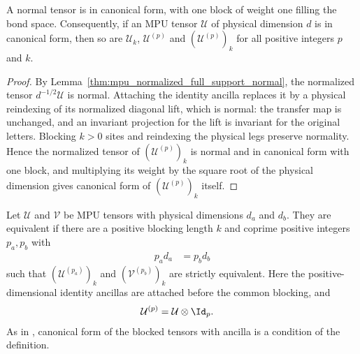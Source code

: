 \begin{lemma}
    \label{thm:mpu_canonical_form_ancilla_blocking}
    \leanok
    A normal tensor is in canonical form, with one block of weight one
    filling the bond space. Consequently, if an MPU tensor $\mathcal U$ of
    physical dimension $d$ is in canonical form, then so are $\mathcal U_k$,
    $\mathcal U^{(p)}$ and $(\mathcal U^{(p)})_k$ for all positive integers
    $p$ and $k$.
\end{lemma}

\begin{proof}\leanok
    By Lemma~\ref{thm:mpu_normalized_full_support_normal}, the normalized
    tensor $d^{-1/2}\mathcal U$ is normal. Attaching the identity ancilla
    replaces it by a physical reindexing of its normalized diagonal lift,
    which is normal: the transfer map is unchanged, and an invariant
    projection for the lift is invariant for the original letters. Blocking
    $k>0$ sites and reindexing the physical legs preserve normality. Hence
    the normalized tensor of $(\mathcal U^{(p)})_k$ is normal and in
    canonical form with one block, and multiplying its weight by the square
    root of the physical dimension gives canonical form of
    $(\mathcal U^{(p)})_k$ itself.
\end{proof}

\begin{definition}
    \label{def:equivalent-tensors}
    \leanok
    Let $\mathcal U$ and $\mathcal V$ be MPU
    tensors with physical dimensions $d_a$ and $d_b$. They are equivalent if
    there are a
    positive blocking length $k$ and coprime positive integers $p_a,p_b$ with
    \begin{align}
        p_a d_a & =p_b d_b
    \end{align}
    such that $(\mathcal U^{(p_a)})_k$ and $(\mathcal V^{(p_b)})_k$ are strictly
    equivalent. Here the positive-dimensional identity ancillas are attached
    before the common blocking, and
    \begin{align}
        \mathcal U^{(p)} & =\mathcal U\otimes\Id_p.
    \end{align}
    As in \cite[lines~716--724]{Cirac2017MPU}, canonical form of the blocked
    tensors with ancilla is a condition of the definition.
\end{definition}

